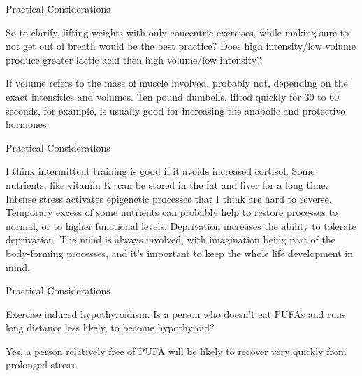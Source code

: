 \documentclass[11pt,oneside,openany,extrafontsizes]{memoir}
\begin{document}
\begin{qaexchange}{Practical Considerations}

    \begin{question}
        So to clarify, lifting weights with only concentric exercises, while making sure to not get out of breath would be the best practice? Does high intensity/low volume produce greater lactic acid then high volume/low intensity?
    \end{question}

    \begin{answer}
        If volume refers to the mass of muscle involved, probably not, depending on the exact intensities and volumes. Ten pound dumbells, lifted quickly for 30 to 60 seconds, for example, is usually good for increasing the anabolic and protective hormones.
    \end{answer}
\end{qaexchange}

\begin{standalonequote}{Practical Considerations}

    \begin{answer}
        I think intermittent training is good if it avoids increased cortisol. Some nutrients, like vitamin K, can be stored in the fat and liver for a long time. Intense stress activates epigenetic processes that I think are hard to reverse. Temporary excess of some nutrients can probably help to restore processes to normal, or to higher functional levels. Deprivation increases the ability to tolerate deprivation. The mind is always involved, with imagination being part of the body-forming processes, and it's important to keep the whole life development in mind.
    \end{answer}
\end{standalonequote}

\begin{qaexchange}{Practical Considerations}

    \begin{question}
        Exercise induced hypothyroidism: Is a person who doesn't eat PUFAs and runs long distance less likely, to become hypothyroid?
    \end{question}

    \begin{answer}
        Yes, a person relatively free of PUFA will be likely to recover very quickly from prolonged stress.
    \end{answer}
\end{qaexchange}
\end{document}
